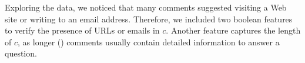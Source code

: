 Exploring the data, we noticed that many \good comments suggested visiting a 
Web site or writing to an email address. Therefore, we included two boolean 
features to verify the presence of URLs or emails in $c$. Another feature 
captures the length of $c$, as longer (\good) comments usually contain detailed 
information to answer a question. 



% 
% 
% 


% 
% 
% 
% 
% 



